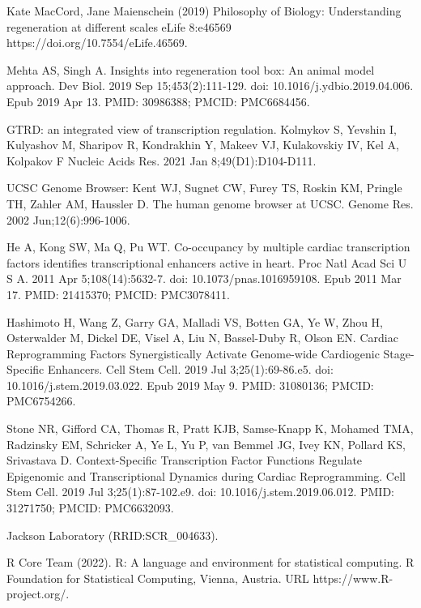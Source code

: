 \documentclass[12pt]{article}
\begin{document}

\begin{thebibliography}{99}

 Kate MacCord, Jane Maienschein (2019) Philosophy of
Biology: Understanding regeneration at different scales eLife 8:e46569
https://doi.org/10.7554/eLife.46569.

 Mehta AS, Singh A. Insights into regeneration tool box:
An animal model approach. Dev Biol. 2019 Sep 15;453(2):111-129.
doi: 10.1016/j.ydbio.2019.04.006. Epub 2019 Apr 13. PMID: 30986388;
PMCID: PMC6684456.

 GTRD: an integrated view of transcription regulation.
Kolmykov S, Yevshin I, Kulyashov M, Sharipov R, Kondrakhin Y, Makeev VJ,
Kulakovskiy IV, Kel A, Kolpakov F Nucleic Acids Res. 2021 Jan
8;49(D1):D104-D111.

 UCSC Genome Browser: Kent WJ, Sugnet CW, Furey TS, Roskin KM,
Pringle TH, Zahler AM, Haussler D. The human genome browser at UCSC. Genome Res.
2002 Jun;12(6):996-1006.

 He A, Kong SW, Ma Q, Pu WT. Co-occupancy by multiple cardiac
transcription factors identifies transcriptional enhancers active in heart.
Proc Natl Acad Sci U S A. 2011 Apr 5;108(14):5632-7.
doi: 10.1073/pnas.1016959108. Epub 2011 Mar 17. PMID: 21415370;
PMCID: PMC3078411.

 Hashimoto H, Wang Z, Garry GA, Malladi VS, Botten GA, Ye W,
Zhou H, Osterwalder M, Dickel DE, Visel A, Liu N, Bassel-Duby R, Olson EN.
Cardiac Reprogramming Factors Synergistically Activate Genome-wide Cardiogenic
Stage-Specific Enhancers. Cell Stem Cell. 2019 Jul 3;25(1):69-86.e5.
doi: 10.1016/j.stem.2019.03.022. Epub 2019 May 9. PMID: 31080136;
PMCID: PMC6754266.

 Stone NR, Gifford CA, Thomas R, Pratt KJB, Samse-Knapp K,
Mohamed TMA, Radzinsky EM, Schricker A, Ye L, Yu P, van Bemmel JG, Ivey KN,
Pollard KS, Srivastava D. Context-Specific Transcription Factor Functions
Regulate Epigenomic and Transcriptional Dynamics during Cardiac Reprogramming.
Cell Stem Cell. 2019 Jul 3;25(1):87-102.e9. doi: 10.1016/j.stem.2019.06.012.
PMID: 31271750; PMCID: PMC6632093.

 Jackson Laboratory (RRID:SCR\_004633).

 R Core Team (2022).
R: A language and environment for statistical computing. R Foundation
for Statistical Computing, Vienna, Austria. URL https://www.R-project.org/.


\end{thebibliography}
\end{document}
